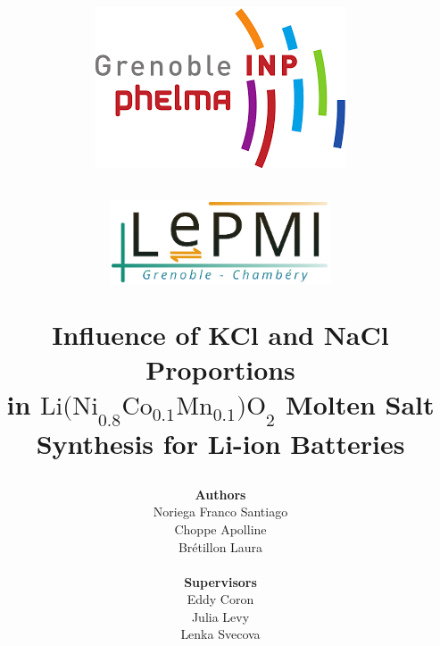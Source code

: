 \documentclass{article}
\begin{document}
\title{
  \vspace{-5cm}  %
  \begin{minipage}{0.45\textwidth}
    \centering
    \includegraphics[width=\textwidth]{images.png}  %
   \vspace{2cm}
  \end{minipage}
  \begin{minipage}{0.45\textwidth}
    \centering
    \includegraphics[width=\textwidth]{lepmi_logo.png}
    \vspace{2cm}
  \end{minipage}
  \textbf{\Huge Influence of KCl and NaCl Proportions \\ in \(\text{Li(Ni}_{0.8}\text{Co}_{0.1}\text{Mn}_{0.1}\text{)O}_{2}\) Molten Salt Synthesis for Li-ion Batteries}
    \vspace{4cm}
  }
 

\author{
  \textbf{Authors}\\
  Noriega Franco Santiago \\
  Choppe Apolline \\
  Brétillon Laura\\
  \\
  \textbf{Supervisors}\\
  Eddy Coron\\
  Julia Levy\\
  Lenka Svecova}
\end{document}
